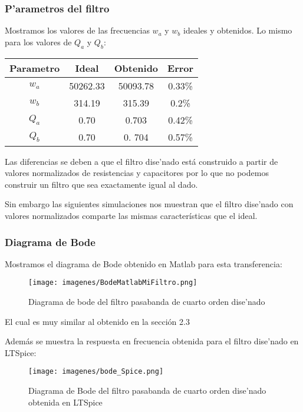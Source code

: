 \documentclass[12pt, titlepage]{article}
\begin{document}
   \subsubsection{P'arametros del filtro}
   Mostramos los valores de las frecuencias $w_a$ y $w_b$ ideales y obtenidos. Lo mismo para los valores de $Q_a$ y $Q_b$:
   \begin{center}
        \begin{tabular}{| c | c | c | c |}
        \hline
        Parametro & Ideal & Obtenido  & Error\\ \hline
        $w_a$ & 50262.33& 50093.78& 0.33\% \\
        $w_b$ &  314.19& 315.39& 0.2\%\\
        $Q_a$ &  0.70& 0.703& 0.42\% \\
        $Q_b$ & 0.70&0. 704& 0.57\%\\ \hline
        \end{tabular}
   \end{center}

   
   
   Las diferencias se deben a que el filtro dise'nado está construido a partir de valores normalizados de resistencias y capacitores por lo que no podemos construir un filtro que sea exactamente igual al dado.
   
   Sin embargo las siguientes simulaciones nos muestran que el filtro dise'nado con valores normalizados comparte las mismas características que el ideal.
   
   \newpage
   
   \subsubsection{Diagrama de Bode}
   
   Mostramos el diagrama de Bode obtenido en Matlab para esta transferencia: 
   \begin{figure}[!htb]
    \texttt{[image: imagenes/BodeMatlabMiFiltro.png]}
    \centering
    \caption{Diagrama de bode del filtro pasabanda de cuarto orden dise'nado}
    \end{figure}
    
    El cual es muy similar al obtenido en la sección 2.3
    
    Además se muestra la respuesta en frecuencia obtenida para el filtro dise'nado en LTSpice:
    \begin{figure}[!htb]
    \texttt{[image: imagenes/bode\_Spice.png]}
    \centering
    \caption{Diagrama de Bode del filtro pasabanda de cuarto orden dise'nado obtenida en LTSpice}
    \end{figure}
    
\end{document}

